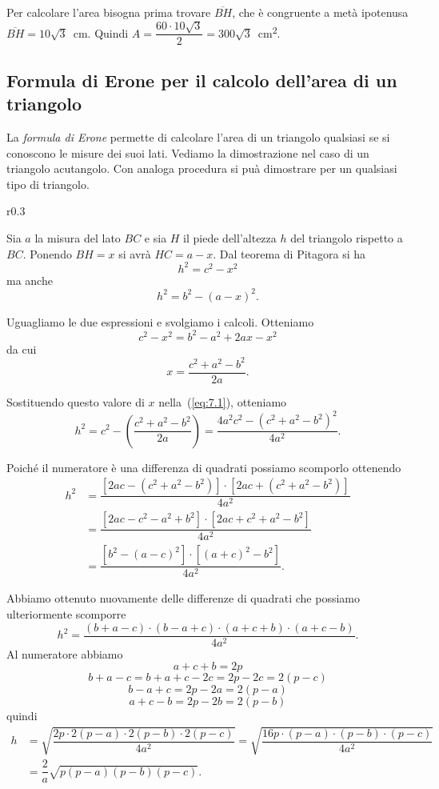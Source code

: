 \begin{exrig}
\begin{esempio}
Per calcolare l'area bisogna prima trovare $\overline{BH}$, che è 
congruente a metà ipotenusa $\overline{BH}=10\sqrt{3}$~cm. Quindi 
$A=\dfrac{60\cdot 10\sqrt{3}}{2}=300\sqrt{3}$~cm\textsuperscript{2}.
\end{esempio}
\end{exrig}

\subsection{Formula di Erone per il calcolo dell'area di un triangolo}

La \emph{formula di Erone} permette di calcolare l'area di un 
triangolo qualsiasi se si conoscono le misure dei suoi lati.
Vediamo la dimostrazione nel caso di un triangolo acutangolo. Con analoga procedura si puà dimostrare per un qualsiasi tipo di triangolo.

\begin{wrapfigure}{r}{0.3\textwidth}
	\centering
	\vspace{10pt}
\end{wrapfigure}
Sia $a$ la misura del lato $BC$ e sia $H$ il piede dell'altezza $h$ 
del triangolo rispetto a $BC$. Ponendo $BH = x$ si avrà $HC = a - x$.
Dal teorema di Pitagora si ha
\begin{equation}\label{eq:7.1}
h^2=c^2-x^2
\end{equation}
ma anche
\[h^2=b^2-(a-x)^2.\]

Uguagliamo le due espressioni e svolgiamo i calcoli. Otteniamo
\[c^2-x^2=b^2-a^2+2ax-x^2\]
da cui
\[x=\dfrac{c^2+a^2-b^2}{2a}.\]

Sostituendo questo valore di $x$ nella~(\ref{eq:7.1}), otteniamo
\[h^2=c^2-\left(\dfrac{c^2+a^2-b^2}{2a}\right)=\dfrac{
4a^2c^2-\left(c^2+a^2-b^2\right)^2}{4a^2}.\]

Poiché il numeratore è una differenza di quadrati possiamo scomporlo 
ottenendo
\begin{align*}
h^2&=\dfrac{\left[2ac-\left(c^2+a^2-b^2\right)\right]\cdot\left[
2ac+\left(c^2+a^2-b^2\right)\right]}{4a^2}\\
&=\dfrac{\left[2ac-c^2-a^2+b^2\right]\cdot\left[2ac+c^2+a^2-b^2\right]
}{4a^2}\\
&=\dfrac{\left[b^2-(a-c)^2\right]\cdot\left[(a+c)^2-b^2\right]}{4a^2}.
\end{align*}

Abbiamo ottenuto nuovamente delle differenze di quadrati che possiamo 
ulteriormente scomporre
\[h^2=\dfrac{(b+a-c)\cdot(b-a+c)\cdot(a+c+b)\cdot(a+c-b)}{4a^2}.\]
Al numeratore abbiamo
\[a + c + b = 2p\]
\[b + a - c = b+a+c-2c = 2p-2c = 2(p-c)\]
\[b - a + c = 2p - 2a = 2 (p - a)\]
\[a + c - b = 2p - 2b = 2(p - b)\]
quindi
\begin{align*}
h&=\sqrt{\dfrac{2p\cdot 2(p-a) \cdot 2(p-b) \cdot 
2(p-c)}{4a^2}}=\sqrt{\dfrac{16p\cdot (p-a) \cdot (p-b) \cdot 
(p-c)}{4a^2}}\\
&=\dfrac{2}{a}\sqrt{p(p-a)(p-b)(p-c)}.
\end{align*}

